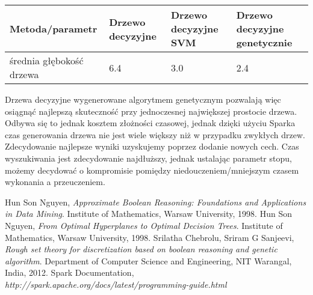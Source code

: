 \documentclass[magisterska]{pracamgr}
\theoremstyle{plain}
\theoremstyle{definition}
\theoremstyle{remark}
\begin{document}
\begin{center}
 \begin{tabular}{l || P{2.5cm} | P{2.5cm} | P{2.5cm}}
  Metoda/parametr     & Drzewo decyzyjne & Drzewo decyzyjne SVM & Drzewo decyzyjne genetycznie \\ 
  \hline
  średnia głębokość drzewa & 6.4     & 3.0     & 2.4  \\
 \end{tabular}
\end{center}

Drzewa decyzyjne wygenerowane algorytmem genetycznym pozwalają więc osiągnąć najlepszą skuteczność przy jednoczesnej największej prostocie
drzewa. Odbywa się to jednak kosztem złożności czasowej, jednak dzięki użyciu Sparka czas generowania drzewa nie jest wiele większy niż
w przypadku zwykłych drzew. Zdecydowanie najlepsze wyniki uzyskujemy poprzez dodanie nowych cech. Czas wyszukiwania jest zdecydowanie najdłuższy,
jednak ustalając parametr stopu, możemy decydować o kompromisie pomiędzy niedouczeniem/mniejszym czasem wykonania a przeuczeniem. 
\begin{thebibliography}{9}

  Hun Son Nguyen,
  \emph{Approximate Boolean Reasoning: Foundations and Applications in Data Mining}.
  Institute of Mathematics, Warsaw University,
  1998.
  Hun Son Nguyen,
  \emph{From Optimal Hyperplanes to Optimal Decision Trees}.
  Institute of Mathematics, Warsaw University,
  1998.
  Srilatha Chebrolu, Sriram G Sanjeevi,
  \emph{Rough set theory for discretization based on boolean reasoning and 
  genetic algorithm}.
  Department of Computer Science and Engineering, NIT Warangal, India,
  2012.
 Spark Documentation,
 \emph{http://spark.apache.org/docs/latest/programming-guide.html}

\end{thebibliography}
 
\end{document}
